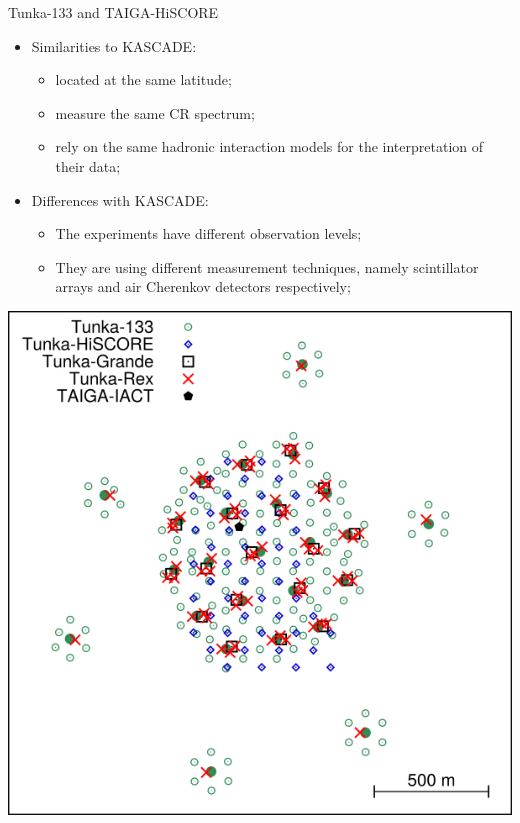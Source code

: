 
%

\begin{frame}{Tunka-133 and TAIGA-HiSCORE}
\begin{minipage}[c]{0.49\textwidth}
\begin{itemize}
  \item Similarities to KASCADE:
  \begin{itemize}
    \item located at the same latitude;
    \item measure the same CR spectrum;
    \item rely on the same hadronic interaction models for the interpretation of their data;
  \end{itemize}
  \item Differences with KASCADE:
  \begin{itemize}
    \item The experiments have different observation levels;
    \item They are using different measurement techniques, namely scintillator arrays and air Cherenkov detectors respectively;
  \end{itemize}
\end{itemize}
\end{minipage}
\hfill
\begin{minipage}[c]{0.5\textwidth}
\includegraphics[width=1\textwidth]{pics/taiga_map.png}
\end{minipage}

\end{frame}


